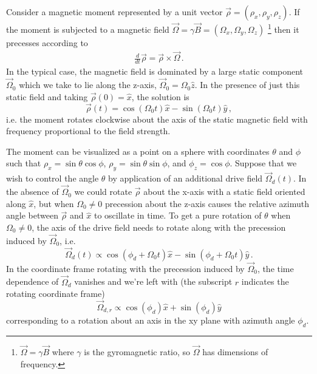 
Consider a magnetic moment represented by a unit vector $\vec{\rho} = (\rho_x, \rho_y, \rho_z)$.
If the moment is subjected to a magnetic field $\vec{\Omega} = \gamma \vec{B} = (\Omega_x, \Omega_y, \Omega_z)$ \footnote{$\vec{\Omega} = \gamma \vec{B}$ where $\gamma$ is the gyromagnetic ratio, so $\vec{\Omega}$ has dimensions of frequency.} then it precesses according to 
\begin{align*}
  \frac{d}{dt} \vec{\rho} = \vec{\rho} \times \vec{\Omega}
  \, .
\end{align*}
In the typical case, the magnetic field is dominated by a large static component $\vec{\Omega}_0$ which we take to lie along the z-axis, $\vec{\Omega}_0 = \Omega_0 \hat{z}$.
In the presence of just this static field and taking $\vec{\rho}(0) = \hat{x}$, the solution is
\begin{equation}
  \vec \rho (t) = \cos(\Omega_0 t) \hat{x} - \sin(\Omega_0 t) \hat{y} \, ,
  \label{eq:moment_free_motion}
\end{equation}
i.e. the moment rotates clockwise about the axis of the static magnetic field with frequency proportional to the field strength.

The moment can be visualized as a point on a sphere with coordinates $\theta$ and $\phi$ such that $\rho_x = \sin\theta \cos\phi$, $\rho_y = \sin\theta \sin\phi$, and $\phi_z = \cos\phi$.
Suppose that we wish to control the angle $\theta$ by application of an additional drive field $\vec{\Omega}_d(t)$.
In the absence of $\vec{\Omega}_0$ we could rotate $\vec\rho$ about the x-axis with a static field oriented along $\hat{x}$, but when $\Omega_0 \neq 0$ precession about the z-axis causes the relative azimuth angle between $\vec\rho$ and $\hat{x}$ to oscillate in time.
To get a pure rotation of $\theta$ when $\Omega_0 \neq 0$, the axis of the drive field needs to rotate along with the precession induced by $\vec{\Omega}_0$, i.e.
\begin{equation*}
  \vec{\Omega}_d(t)
  \propto \cos(\phi_d + \Omega_0 t) \hat{x} - \sin(\phi_d + \Omega_0 t) \hat{y}
  \, .
\end{equation*}
In the coordinate frame rotating with the precession induced by $\vec{\Omega}_0$, the time dependence of $\vec{\Omega}_d$ vanishes and we're left with (the subscript $r$ indicates the rotating coordinate frame)
\begin{equation}
  \vec{\Omega}_{d, r} \propto \cos(\phi_d) \hat{x} + \sin(\phi_d) \hat{y}
  \label{eq:moment_rotating_drive}
\end{equation}
corresponding to a rotation about an axis in the xy plane with azimuth angle $\phi_d$.

